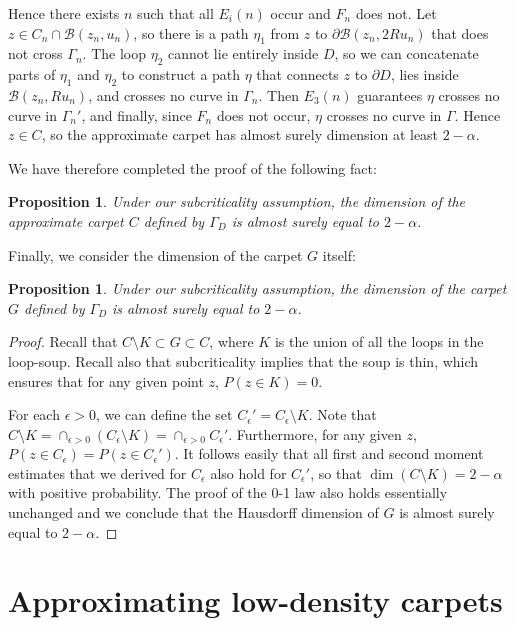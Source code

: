 \documentclass[11pt]{article}
\newtheorem {Proposition}[Theorem]    {Proposition}
\newtheorem {proposition}[Theorem]    {Proposition}
\newcommand{\eps}{\epsilon}
\newcommand{\cir}{\partial \B}
\newcommand{\B}{{\mathcal B}}
\begin{document}
Hence there exists $n$ such that all $E_i(n)$ occur and $F_n$ does not.
Let $z \in C_n \cap \B (z_n, u_n)$, so there is a path $\eta_1$
from $z$ to $\cir (z_n, 2R u_n)$ that does not cross $\Gamma_n$.
The loop $\eta_2$ cannot lie entirely inside $D$, so we can concatenate
parts of $\eta_1$ and $\eta_2$
to construct a path $\eta$ that connects $z$ to $\partial D$, lies
inside $\B(z_n, R u_n)$, and crosses no curve in $\Gamma_n$.
Then $E_3(n)$ guarantees $\eta$ crosses no curve in $\Gamma_n'$,
and finally, since $F_n$ does not occur, $\eta$ crosses no curve in $\Gamma$.
Hence $z \in C$, so the approximate carpet has almost surely
dimension at least
$2 - \alpha$. 


We have therefore completed the proof of the following fact:

\begin {proposition}
Under our subcriticality assumption, 
the dimension of the approximate carpet $C$ defined by 
$\Gamma_D$ is almost surely equal to $2- \alpha$. 
\end {proposition}

Finally, we consider the dimension of the carpet $G$ itself:

\begin{Proposition}
Under our subcriticality assumption, 
the dimension of the carpet $G$ defined by 
$\Gamma_D$ is almost surely equal to $2- \alpha$. 
\end{Proposition}

\begin{proof}
Recall that $C \setminus K \subset G \subset C$, where $K$ is the union of all the loops in the loop-soup.
Recall also that subcriticality implies that the soup is thin, which ensures that for any given point $z$, 
$P ( z \in K ) = 0$.

For each $\eps > 0$, we can define the set $C_\eps' = C_\eps \setminus K$. 
Note that  $C \setminus K = \cap_{\eps > 0 } (C_\eps \setminus K ) = \cap_{\eps > 0} C_\eps'$. 
Furthermore, for any given $z$, $P ( z \in C_\eps) = P ( z \in C_\eps')$. 
It follows easily that all first and second moment estimates that we derived for $C_\eps$ 
also hold for $C_\eps'$, so that $\dim (C \setminus K) = 2-\alpha$ with positive probability.
The proof of the 0-1 law also holds essentially unchanged
and we conclude that
the Hausdorff dimension of $G$ is almost surely equal to $2- \alpha$.
\end{proof}


\section {Approximating low-density carpets}
\end{document}
